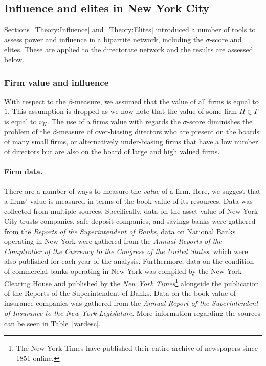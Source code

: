 
\subsection{Influence and elites in New York City}

Sections~\ref{Theory:Influence} and~\ref{Theory:Elites} introduced a number of tools to assess power and influence in a bipartite network, including the $\sigma$-score and elites. These are applied to the directorate network and the results are assessed below.

\subsubsection*{Firm value and influence}

With respect to the $\beta$-measure, we assumed that the value of all firms is equal to $1$. This assumption is dropped as we now note that the value of some firm $H \in \Gamma$ is equal to $\nu_{H}$. The use of a firms value with regards the $\sigma$-score diminishes the problem of the $\beta$-measure of over-biasing directors who are present on the boards of many small firms, or alternatively under-biasing firms that have a low number of directors but are also on the board of large and high valued firms.

\paragraph{Firm data.}

There are a number of ways to measure the \emph{value} of a firm. Here, we suggest that a firms' value is measured in terms of the book value of its resources. Data was collected from multiple sources. Specifically, data on the asset value of New York City trusts companies, safe deposit companies, and savings banks were gathered from the \emph{Reports of the Superintendent of Banks}, data on National Banks operating in New York were gathered from the \emph{Annual Reports of the Comptroller of the Currency to the Congress of the United States}, which were also published for each year of the analysis. Furthermore, data on the condition of commercial banks operating in New York was compiled by the New York Clearing House and published by the \emph{New York Times}\footnote{The New York Times have published their entire archive of newspapers since 1851 online.} alongside the publication of the Reports of the Superintendent of Banks. Data on the book value of insurance companies was gathered from the \emph{Annual Report of the Superintendent of Insurance to the New York Legislature}. More information regarding the sources can be seen in Table~\ref{vardesc}.

